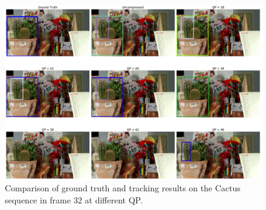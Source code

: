 \begin{figure}[!tb]
  \centering
  \includegraphics[width=1.0\linewidth]{img/Cactus_58_frame032.pdf}
  \caption[Comparison of ground truth and tracking results on the Cactus sequence in frame 32 at different QP]
  {
    Comparison of ground truth and tracking results on the Cactus sequence in frame 32 at different QP.
  }
  \label{fig:Cactus_58_frame032}
\end{figure}